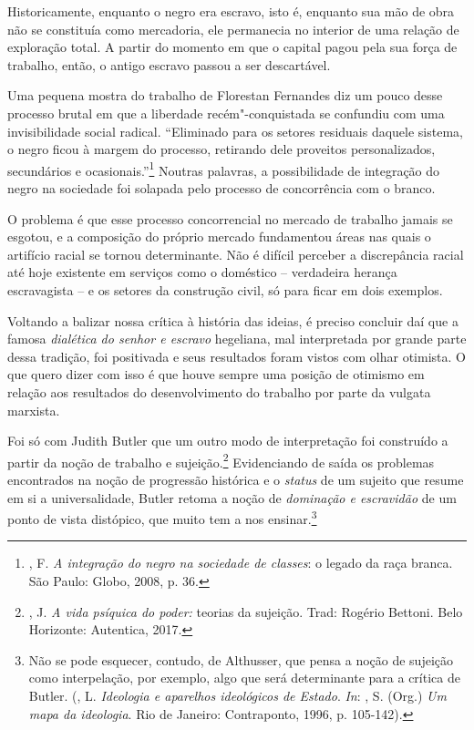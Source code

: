 Historicamente, enquanto o negro era escravo, isto é, enquanto sua mão
de obra não se constituía como mercadoria, ele permanecia no interior de
uma relação de exploração total. A partir do momento em que o capital
pagou pela sua força de trabalho, então, o antigo escravo passou a ser
descartável.

Uma pequena mostra do trabalho de Florestan Fernandes diz um pouco desse
processo brutal em que a liberdade recém"-conquistada se confundiu com
uma invisibilidade social radical. ``Eliminado para os setores residuais
daquele sistema, o negro ficou à margem do processo, retirando dele
proveitos personalizados, secundários e ocasionais.''\footnote{,
  F. \emph{A integração do negro na sociedade de classes}: o legado da
  raça branca. São Paulo: Globo, 2008, p. 36.} Noutras palavras, a
possibilidade de integração do negro na sociedade foi solapada pelo
processo de concorrência com o branco.

O problema é que esse processo concorrencial no mercado de trabalho
jamais se esgotou, e a composição do próprio mercado fundamentou áreas
nas quais o artifício racial se tornou determinante. Não é difícil
perceber a discrepância racial até hoje existente em serviços como o
doméstico -- verdadeira herança escravagista -- e os setores da
construção civil, só para ficar em dois exemplos.

Voltando a balizar nossa crítica à história das ideias, é preciso
concluir daí que a famosa \emph{dialética do senhor e escravo}
hegeliana, mal interpretada por grande parte dessa tradição, foi
positivada e seus resultados foram vistos com olhar otimista. O que
quero dizer com isso é que houve sempre uma posição de otimismo em
relação aos resultados do desenvolvimento do trabalho por parte da
vulgata marxista.

Foi só com Judith Butler que um outro modo de interpretação foi
construído a partir da noção de trabalho e sujeição.\footnote{, J.
  \emph{A vida psíquica do poder:} teorias da sujeição. Trad: Rogério
  Bettoni. Belo Horizonte: Autentica, 2017.} Evidenciando de saída os
problemas encontrados na noção de progressão histórica e o \emph{status}
de um sujeito que resume em si a universalidade, Butler retoma a noção
de \emph{dominação e escravidão} de um ponto de vista distópico, que
muito tem a nos ensinar.\footnote{Não se pode esquecer, contudo, de
  Althusser, que pensa a noção de sujeição como interpelação, por
  exemplo, algo que será determinante para a crítica de Butler.
  (, L. \emph{Ideologia e aparelhos ideológicos de Estado}. \emph{In}: , S. (Org.) \emph{Um mapa da ideologia}. Rio de Janeiro: Contraponto, 1996, p. 105-142).}

